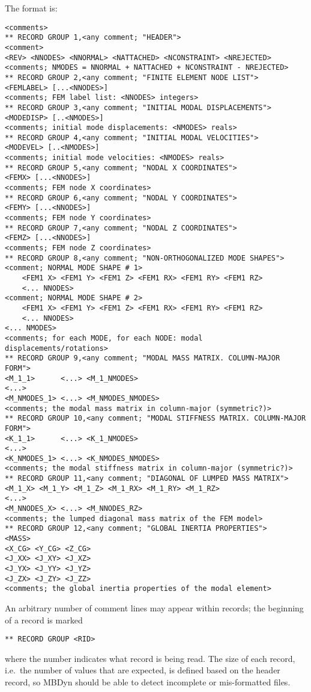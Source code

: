 The format is:
{\small
\begin{verbatim}
<comments>
** RECORD GROUP 1,<any comment; "HEADER">
<comment>
<REV> <NNODES> <NNORMAL> <NATTACHED> <NCONSTRAINT> <NREJECTED>
<comments; NMODES = NNORMAL + NATTACHED + NCONSTRAINT - NREJECTED>
** RECORD GROUP 2,<any comment; "FINITE ELEMENT NODE LIST">
<FEMLABEL> [...<NNODES>]
<comments; FEM label list: <NNODES> integers>
** RECORD GROUP 3,<any comment; "INITIAL MODAL DISPLACEMENTS">
<MODEDISP> [..<NMODES>]
<comments; initial mode displacements: <NMODES> reals>
** RECORD GROUP 4,<any comment; "INITIAL MODAL VELOCITIES">
<MODEVEL> [..<NMODES>]
<comments; initial mode velocities: <NMODES> reals>
** RECORD GROUP 5,<any comment; "NODAL X COORDINATES">
<FEMX> [...<NNODES>]
<comments; FEM node X coordinates>
** RECORD GROUP 6,<any comment; "NODAL Y COORDINATES">
<FEMY> [...<NNODES>]
<comments; FEM node Y coordinates>
** RECORD GROUP 7,<any comment; "NODAL Z COORDINATES">
<FEMZ> [...<NNODES>]
<comments; FEM node Z coordinates>
** RECORD GROUP 8,<any comment; "NON-ORTHOGONALIZED MODE SHAPES">
<comment; NORMAL MODE SHAPE # 1>
    <FEM1 X> <FEM1 Y> <FEM1 Z> <FEM1 RX> <FEM1 RY> <FEM1 RZ>
    <... NNODES>
<comment; NORMAL MODE SHAPE # 2>
    <FEM1 X> <FEM1 Y> <FEM1 Z> <FEM1 RX> <FEM1 RY> <FEM1 RZ>
    <... NNODES>
<... NMODES>
<comments; for each MODE, for each NODE: modal displacements/rotations>
** RECORD GROUP 9,<any comment; "MODAL MASS MATRIX. COLUMN-MAJOR FORM">
<M_1_1>      <...> <M_1_NMODES>
<...>
<M_NMODES_1> <...> <M_NMODES_NMODES>
<comments; the modal mass matrix in column-major (symmetric?)>
** RECORD GROUP 10,<any comment; "MODAL STIFFNESS MATRIX. COLUMN-MAJOR FORM">
<K_1_1>      <...> <K_1_NMODES>
<...>
<K_NMODES_1> <...> <K_NMODES_NMODES>
<comments; the modal stiffness matrix in column-major (symmetric?)>
** RECORD GROUP 11,<any comment; "DIAGONAL OF LUMPED MASS MATRIX">
<M_1_X> <M_1_Y> <M_1_Z> <M_1_RX> <M_1_RY> <M_1_RZ>
<...>
<M_NNODES_X> <...> <M_NNODES_RZ>
<comments; the lumped diagonal mass matrix of the FEM model>
** RECORD GROUP 12,<any comment; "GLOBAL INERTIA PROPERTIES">
<MASS>
<X_CG> <Y_CG> <Z_CG>
<J_XX> <J_XY> <J_XZ>
<J_YX> <J_YY> <J_YZ>
<J_ZX> <J_ZY> <J_ZZ>
<comments; the global inertia properties of the modal element>
\end{verbatim}
}

An arbitrary number of comment lines may appear within records;
the beginning of a record is marked
\begin{verbatim}
** RECORD GROUP <RID>
\end{verbatim}
where the number  indicates what record is being read.
The size of each record, i.e.\ the number of values that are expected,
is defined based on the header record, so MBDyn should be able to detect
incomplete or mis-formatted files.


